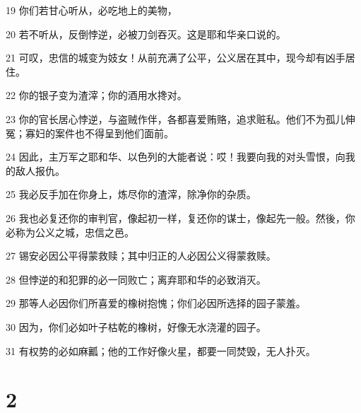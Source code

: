 \par 19 你们若甘心听从，必吃地上的美物，
\par 20 若不听从，反倒悖逆，必被刀剑吞灭。这是耶和华亲口说的。
\par 21 可叹，忠信的城变为妓女！从前充满了公平，公义居在其中，现今却有凶手居住。
\par 22 你的银子变为渣滓；你的酒用水搀对。
\par 23 你的官长居心悖逆，与盗贼作伴，各都喜爱贿赂，追求赃私。他们不为孤儿伸冤；寡妇的案件也不得呈到他们面前。
\par 24 因此，主万军之耶和华、以色列的大能者说：哎！我要向我的对头雪恨，向我的敌人报仇。
\par 25 我必反手加在你身上，炼尽你的渣滓，除净你的杂质。
\par 26 我也必复还你的审判官，像起初一样，复还你的谋士，像起先一般。然後，你必称为公义之城，忠信之邑。
\par 27 锡安必因公平得蒙救赎；其中归正的人必因公义得蒙救赎。
\par 28 但悖逆的和犯罪的必一同败亡；离弃耶和华的必致消灭。
\par 29 那等人必因你们所喜爱的橡树抱愧；你们必因所选择的园子蒙羞。
\par 30 因为，你们必如叶子枯乾的橡树，好像无水浇灌的园子。
\par 31 有权势的必如麻瓤；他的工作好像火星，都要一同焚毁，无人扑灭。

\chapter{2}

